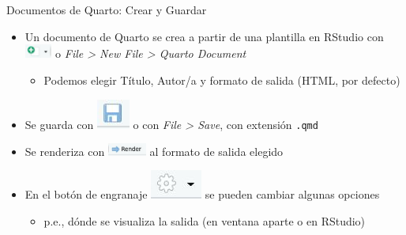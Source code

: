 \documentclass[
  10pt,
  ignorenonframetext,
]{beamer}
\providecommand{\tightlist}{%
  \setlength{\itemsep}{0pt}\setlength{\parskip}{0pt}}\usepackage{longtable,booktabs,array}
\begin{document}
\begin{frame}[fragile]{Documentos de Quarto: Crear y Guardar}
\label{documentos-de-quarto-crear-y-guardar}
\begin{itemize}
\item
  Un documento de Quarto se crea a partir de una plantilla en RStudio
  con
  \includegraphics[width=0.07\textwidth,height=\textheight]{figure/Mas2.jpg}
  o \emph{File \textgreater{} New File \textgreater{} Quarto Document}

  \begin{itemize}
  \tightlist
  \item
    Podemos elegir Título, Autor/a y formato de salida (HTML, por
    defecto)
  \end{itemize}
\end{itemize}

\begin{itemize}
\item
  Se guarda con \includegraphics{figure/Guardar.jpg} o con \emph{File
  \textgreater{} Save}, con extensión \texttt{.qmd}
\item
  Se renderiza con
  \includegraphics[width=0.1\textwidth,height=\textheight]{figure/Render.jpg}
  al formato de salida elegido
\item
  En el botón de engranaje \includegraphics{figure/Engranaje.jpg} se
  pueden cambiar algunas opciones

  \begin{itemize}
  \tightlist
  \item
    p.e., dónde se visualiza la salida (en ventana aparte o en RStudio)
  \end{itemize}
\end{itemize}
\end{frame}
\end{document}
